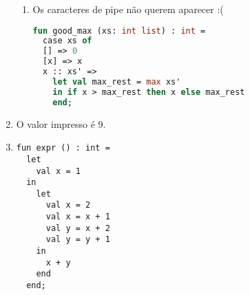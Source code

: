 \documentclass{article}
\begin{document}
\begin{enumerate}
\begin{enumerate}
      \item Os caracteres de pipe não querem aparecer :(
        \begin{lstlisting}[language=ML]  
fun good_max (xs: int list) : int =
  case xs of
  [] => 0
  [x] => x
  x :: xs' =>
    let val max_rest = max xs'
    in if x > max_rest then x else max_rest
    end;
        \end{lstlisting}
    \end{enumerate}
  \item  O valor impresso é 9.
  \item 
\begin{lstlisting}
fun expr () : int =
  let
    val x = 1
  in
    let
      val x = 2
      val x = x + 1
      val y = x + 2
      val y = y + 1
    in
      x + y
    end
  end;
\end{lstlisting}
\end{enumerate}
\end{document}
